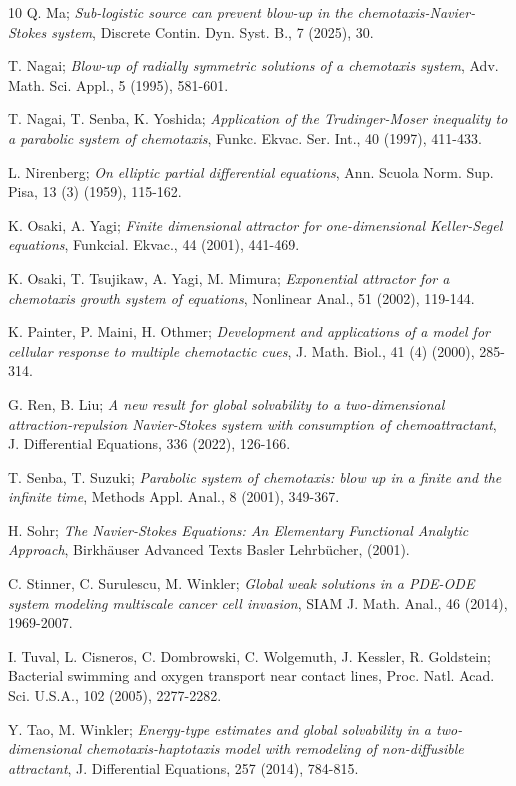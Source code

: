 \documentclass[reqno]{amsart}
\begin{document}
\begin{thebibliography}{10}
 Q. Ma;
\emph{Sub-logistic source can prevent blow-up in the chemotaxis-Navier-Stokes system}, 
Discrete Contin. Dyn. Syst. B., 7 (2025), 30.

 T. Nagai;
\emph{Blow-up of radially symmetric solutions of a chemotaxis system}, 
Adv. Math. Sci. Appl., 5 (1995), 581-601.

 T. Nagai, T. Senba, K. Yoshida;
\emph{Application of the Trudinger-Moser inequality to a parabolic system of chemotaxis},
Funkc. Ekvac. Ser. Int., 40 (1997), 411-433.

 L. Nirenberg;
\emph{On elliptic partial differential equations},
 Ann. Scuola Norm. Sup. Pisa, 13 (3) (1959), 115-162.

 K. Osaki, A. Yagi;
\emph{Finite dimensional attractor for one-dimensional Keller-Segel equations}, 
Funkcial. Ekvac., 44 (2001), 441-469.

 K. Osaki, T. Tsujikaw, A. Yagi, M. Mimura;
\emph{Exponential attractor for a chemotaxis growth system of equations}, 
Nonlinear Anal., 51 (2002), 119-144.

 K. Painter, P. Maini, H. Othmer;
\emph{Development and applications of a model for cellular response to multiple
 chemotactic cues}, J. Math. Biol., 41 (4) (2000), 285-314.

 G. Ren, B. Liu;
\emph{A new result for global solvability to a two-dimensional attraction-repulsion
 Navier-Stokes system with consumption of chemoattractant}, 
J. Differential Equations, 336 (2022), 126-166.

 T. Senba, T. Suzuki;
\emph{Parabolic system of chemotaxis: blow up in a finite and the infinite time},
 Methods Appl. Anal., 8 (2001), 349-367.

 H. Sohr;
\emph{The Navier-Stokes Equations: An Elementary Functional Analytic Approach}, 
Birkh\"auser Advanced Texts Basler Lehrb\"{u}cher, (2001).

 C. Stinner, C. Surulescu, M. Winkler;
\emph{Global weak solutions in a PDE-ODE system modeling multiscale cancer cell 
invasion}, SIAM J. Math. Anal., 46 (2014), 1969-2007.

 I. Tuval, L. Cisneros, C. Dombrowski, C. Wolgemuth, J. Kessler, R. Goldstein; Bacterial swimming and oxygen transport near contact lines, Proc. Natl. Acad. Sci. U.S.A., 102 (2005), 2277-2282.

 Y. Tao, M. Winkler;
\emph{Energy-type estimates and global solvability in a two-dimensional 
chemotaxis-haptotaxis model with remodeling of non-diffusible attractant}, 
J. Differential Equations, 257 (2014), 784-815.


\end{thebibliography}
\end{document}
